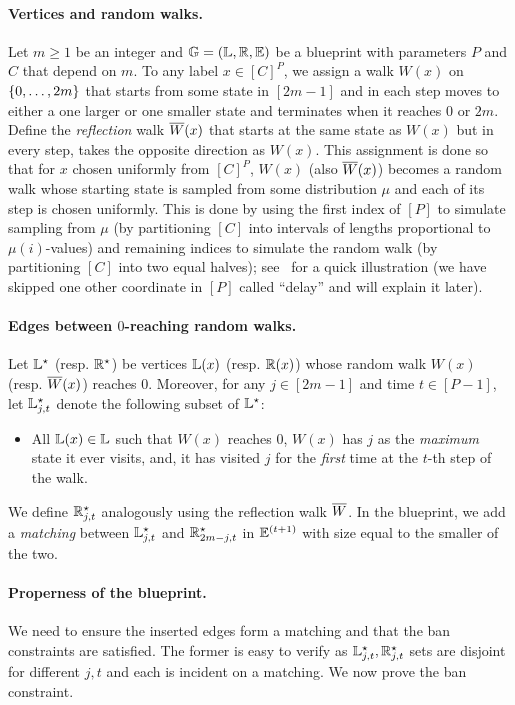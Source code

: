 \paragraph{Vertices and random walks.} Let $m \geq 1$ be an integer and $\mathbb{G} = (\mathbb{L},\mathbb{R},\mathbb{E})$ be a blueprint with parameters $P$ and $C$ that depend on $m$. 
To any label $x \in [C]^P$, we assign a walk $W(x)$ on $\left\{ 0,\ldots,2m \right\}$ that starts from some state in $[2m-1]$ and in each step moves to either a one larger or one smaller 
state and terminates when it reaches $0$ or $2m$. Define the \emph{reflection} walk $\overline{W}(x)$ that starts at the same state as $W(x)$ but in every step, takes the opposite direction as $W(x)$. 
This assignment is done so that for $x$ chosen uniformly from $[C]^P$, $W(x)$ (also $\overline{W}(x)$) becomes a random walk whose starting state is sampled from some distribution $\mu$ and 
each of its step is chosen uniformly. This is done by using the first index of $[P]$ 
to simulate sampling from $\mu$ (by partitioning $[C]$ into intervals of lengths proportional to $\mu(i)$-values) and remaining indices to simulate the random walk (by partitioning $[C]$ into two equal halves); see~ for a quick illustration (we have
skipped one other coordinate in $[P]$ called ``delay'' and will explain it later). 

\paragraph{Edges between $0$-reaching random walks.} Let $\mathbb{L}^{\star}$ (resp. $\mathbb{R}^{\star}$) be vertices $\mathbb{L}(x)$ (resp. $\mathbb{R}(x)$) whose random walk $W(x)$ (resp. $\overline{W}(x)$) reaches $0$. Moreover, for any $j \in [2m-1]$ and time $t \in [P-1]$, let $\mathbb{L}^{\star}_{j,t}$ denote the following subset of $\mathbb{L}^{\star}$: 
\begin{itemize}
	\item All $\mathbb{L}(x) \in \mathbb{L}$ such that $W(x)$ reaches $0$, $W(x)$ has $j$ as the \emph{maximum} state it ever visits, and, it has visited $j$ for the \emph{first} time at the $t$-th step of the walk. 
\end{itemize} 
We define $\mathbb{R}^{\star}_{j,t}$ analogously using the reflection walk $\overline{W}$. In the blueprint, we add a \emph{matching} between $\mathbb{L}^{\star}_{j,t}$ and $\mathbb{R}^{\star}_{2m-j,t}$ in $\mathbb{E}^{(t+1)}$ with size equal to the smaller of the two. 

\paragraph{Properness of the blueprint.} We need to ensure the inserted edges form a matching and that the ban constraints are satisfied. The former is easy to verify as $\mathbb{L}^{\star}_{j,t},\mathbb{R}^{\star}_{j,t}$ sets are disjoint for different $j,t$ and each is incident on a matching. We now prove the ban constraint.

